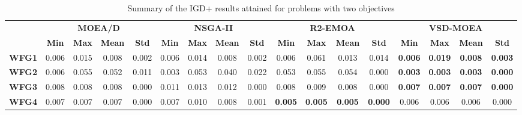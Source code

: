 \begin{table*}[t]
\caption{Summary of the IGD+ results attained for problems with two objectives}
\label{tab:StatisticsIGDP_2obj}
\centering
\begin{scriptsize}
\begin{tabular}{cc|c|c|c|c|c|c|c|c|c|c|c|c|c|c|c}
\cline{2-17}
                                    & \multicolumn{4}{c|}{\textbf{MOEA/D}}                              & \multicolumn{4}{c|}{\textbf{NSGA-II}}                             & \multicolumn{4}{c|}{\textbf{R2-EMOA}}                             & \multicolumn{4}{c}{\textbf{VSD-MOEA}}                            \\ \cline{2-17} 
                                    & \textbf{Min}   & \textbf{Max}   & \textbf{Mean}  & \textbf{Std}   & \textbf{Min}   & \textbf{Max}   & \textbf{Mean}  & \textbf{Std}   & \textbf{Min}   & \textbf{Max}   & \textbf{Mean}  & \textbf{Std}   & \textbf{Min}   & \textbf{Max}   & \textbf{Mean}  & \textbf{Std}   \\ \hline
\multicolumn{1}{c|}{\textbf{WFG1}}  & 0.006          & 0.015          & 0.008          & 0.002          & 0.006          & 0.014          & 0.008          & 0.002          & 0.006          & 0.061          & 0.013          & 0.014          & \textbf{0.006} & \textbf{0.019} & \textbf{0.008} & \textbf{0.003} \\ \hline
\multicolumn{1}{c|}{\textbf{WFG2}}  & 0.006          & 0.055          & 0.052          & 0.011          & 0.003          & 0.053          & 0.040          & 0.022          & 0.053          & 0.055          & 0.054          & 0.000          & \textbf{0.003} & \textbf{0.003} & \textbf{0.003} & \textbf{0.000} \\ \hline
\multicolumn{1}{c|}{\textbf{WFG3}}  & 0.008          & 0.008          & 0.008          & 0.000          & 0.011          & 0.013          & 0.012          & 0.000          & 0.008          & 0.009          & 0.008          & 0.000          & \textbf{0.007} & \textbf{0.007} & \textbf{0.007} & \textbf{0.000} \\ \hline
\multicolumn{1}{c|}{\textbf{WFG4}}  & 0.007          & 0.007          & 0.007          & 0.000          & 0.007          & 0.010          & 0.008          & 0.001          & \textbf{0.005} & \textbf{0.005} & \textbf{0.005} & \textbf{0.000} & 0.006          & 0.006          & 0.006          & 0.000          \\ \hline

\end{tabular}
\end{scriptsize}
\end{table*}
